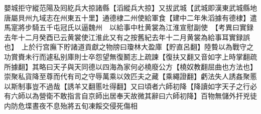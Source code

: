 嬰城拒守縱范陽及囘紇兵大掠諸縣【滔縱兵大掠】又拔武城【武城即漢東武城縣地唐屬貝州九域志在州東五十里】通德棣二州使給軍食【建中二年朱滔據有德棣】遣馬寔將步騎五千屯冠氏以逼魏州　以給事中杜黄裳為江淮宣慰副使　【考異曰實録去年十二月癸酉已云黄裳使江淮此又有之按舊紀去年十二月黄裳為給事耳實録誤也】　上於行宫廡下貯諸道貢獻之物牓曰瓊林大盈庫【貯直呂翻】陸䞇以為戰守之功賞賚未行而遽私别庫則士卒怨望無復鬭志上疏諫【復扶又翻又音如字上時掌翻疏所據翻】其略曰天子與天同德以四海為家何必橈廢公方【橈奴教翻屈曲也方法也】崇聚私貨降至尊而代有司之守辱萬乘以效匹夫之藏【乘繩證翻】虧法失人誘姦聚慝以斯制事豈不過哉【誘羊又翻慝吐得翻】又曰頃者六師初降【降讀如字天子之行必有六師以為營衛不敢指言自京師出居奉天故微其辭曰六師初降】百物無儲外扞兇徒内防危堞晝夜不息殆將五旬凍餒交侵死傷相